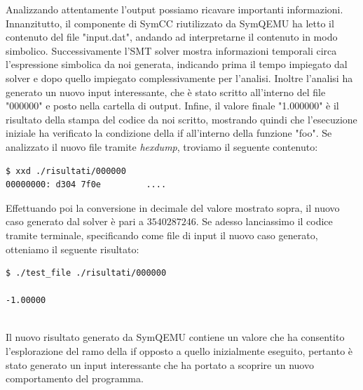\documentclass[Lau, oneside]{sapthesis}%
\begin{document}
\newpage
Analizzando attentamente l'output possiamo ricavare importanti informazioni.
\newline \newline
Innanzitutto, il componente di SymCC riutilizzato da SymQEMU  ha letto il contenuto del file "input.dat", andando ad interpretarne il contenuto in modo simbolico.
\newline
Successivamente l'SMT solver mostra informazioni temporali circa l'espressione simbolica da noi generata, indicando prima il tempo impiegato dal solver e dopo quello impiegato complessivamente per l'analisi.
\newline
Inoltre l'analisi ha generato un nuovo input interessante, che è stato scritto all'interno del file "000000" e posto nella cartella di output.
\newline
Infine, il valore finale "1.000000" è il risultato della stampa del codice da noi scritto, mostrando quindi che l'esecuzione iniziale ha verificato la condizione della if all'interno della funzione "foo".
\newline \newline 
Se analizzato il nuovo file tramite \textit{hexdump}, troviamo il seguente contenuto:
\begin{lstlisting}[xleftmargin=0\textwidth, language=bash]
$ xxd ./risultati/000000
00000000: d304 7f0e         ....
\end{lstlisting}
Effettuando poi la conversione in decimale del valore mostrato sopra, il nuovo caso generato dal solver è pari a $3540287246$.
\newline \newline
Se adesso lanciassimo il codice tramite terminale, specificando come file di input il nuovo caso generato, otteniamo il seguente risultato:
\begin{lstlisting}[xleftmargin=0\textwidth, language=bash]
$ ./test_file ./risultati/000000

-1.00000
\end{lstlisting}
\ \\
Il nuovo risultato generato da SymQEMU contiene un valore che ha consentito l'esplorazione del ramo della if opposto a quello inizialmente eseguito, pertanto è stato generato un input interessante che ha portato a scoprire un nuovo comportamento del programma.








\newpage
\end{document}
